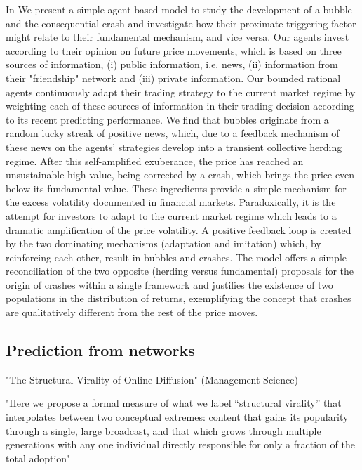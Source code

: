 In \cite{harras2011grow}
We present a simple agent-based model to study the development of a bubble and the consequential crash and investigate how their proximate triggering factor might relate to their fundamental mechanism, and vice versa. Our agents invest according to their opinion on future price movements, which is based on three sources of information, (i) public information, i.e. news, (ii) information from their "friendship" network and (iii) private information. Our bounded rational agents continuously adapt their trading strategy to the current market regime by weighting each of these sources of information in their trading decision according to its recent predicting performance. We find that bubbles originate from a random lucky streak of positive news, which, due to a feedback mechanism of these news on the agents' strategies develop into a transient collective herding regime. After this self-amplified exuberance, the price has reached an unsustainable high value, being corrected by a crash, which brings the price even below its fundamental value. These ingredients provide a simple mechanism for the excess volatility documented in financial markets. Paradoxically, it is the attempt for investors to adapt to the current market regime which leads to a dramatic amplification of the price volatility. A positive feedback loop is created by the two dominating mechanisms (adaptation and imitation) which, by reinforcing each other, result in bubbles and crashes. The model offers a simple reconciliation of the two opposite (herding versus fundamental) proposals for the origin of crashes within a single framework and justifies the existence of two populations in the distribution of returns, exemplifying the concept that crashes are qualitatively different from the rest of the price moves.


\subsection{Prediction from networks}

"The Structural Virality of Online Diffusion" (Management Science)




"Here we propose a formal measure of what we label “structural virality” that interpolates between two conceptual extremes: content that gains its popularity through a single, large broadcast, and that which grows through multiple generations with any one individual directly responsible for only a fraction of the total adoption"

